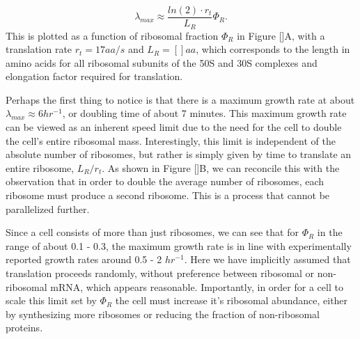 \begin{equation}
\lambda_{max} \approx \frac{ln(2) \cdot r_t}{L_R}  \Phi_R.
\end{equation}
This is plotted as a function of ribosomal fraction
$\Phi_R$ in Figure []A, with a translation rate $r_t = 17 aa/s$ and $L_R = []
aa$, which corresponds to the length in amino acids for all ribosomal subunits of the 50S and 30S complexes
and elongation factor required for translation.

Perhaps the first thing to notice is that there is a maximum growth rate at
about $\lambda_{max} \approx 6 hr^{-1}$, or doubling time of about 7 minutes.
This maximum growth rate can be viewed as an inherent speed limit due to the
need for the cell to double the cell's entire ribosomal mass. Interestingly,
this limit is independent of the absolute number of ribosomes, but rather  is
simply given by time to translate an entire ribosome, $L_R/ r_t$. As shown in
Figure []B,  we can reconcile this with the observation that in order  to double
the average number of ribosomes, each ribosome must produce a second  ribosome.
This is a process that cannot be parallelized further.



Since a cell consists of more than just ribosomes, we can see that for $\Phi_R$
in the range of about 0.1 - 0.3, the maximum growth rate is in line with
experimentally reported growth rates around 0.5 - 2 $hr^{-1}$. Here we have
implicitly assumed that translation proceeds randomly, without preference
between ribosomal or non-ribosomal mRNA, which appears reasonable. Importantly,
in order for a cell to scale this limit set by $\Phi_R$ the cell must increase
it's ribosomal abundance, either by synthesizing more ribosomes or reducing the
fraction of non-ribosomal proteins.

